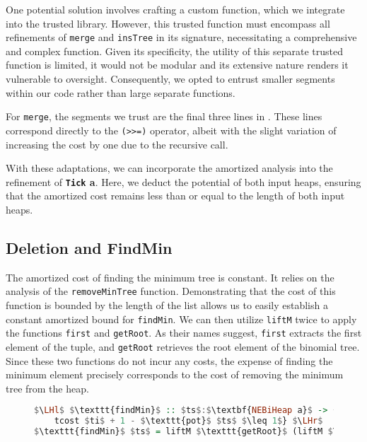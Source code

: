 \documentclass{clmthesis}
\begin{document}
One potential solution involves crafting a custom function, which we integrate into the trusted library. However, this trusted function must encompass all refinements of \texttt{merge} and \texttt{insTree} in its signature, necessitating a comprehensive and complex function. Given its specificity, the utility of this separate trusted function is limited, it would not be modular and its extensive nature renders it vulnerable to oversight. Consequently, we opted to entrust smaller segments within our code rather than large separate functions.

For \texttt{merge}, the segments we trust are the final three lines in . These lines correspond directly to the \texttt{(>>=)} operator, albeit with the slight variation of increasing the cost by one due to the recursive call.

With these adaptations, we can incorporate the amortized analysis into the refinement of \textbf{\lstinline{Tick} a}. Here, we deduct the potential of both input heaps, ensuring that the amortized cost remains less than or equal to the length of both input heaps.


\subsection{Deletion and FindMin}
The amortized cost of finding the minimum tree is constant. It relies on the analysis of the \texttt{removeMinTree} function. Demonstrating that the cost of this function is bounded by the length of the list allows us to easily establish a constant amortized bound for \texttt{findMin}. We can then utilize \texttt{liftM} twice to apply the functions \texttt{first} and \texttt{getRoot}. As their names suggest, \texttt{first} extracts the first element of the tuple, and \texttt{getRoot} retrieves the root element of the binomial tree. Since these two functions do not incur any costs, the expense of finding the minimum element precisely corresponds to the cost of removing the minimum tree from the heap.

\begin{figure}[h]
\begin{lstlisting}[mathescape=true, language=haskell, caption={Amortized cost analysis of \texttt{findMin}.},captionpos=b, label=fig:findMinPot]
$\LHl$ $\texttt{findMin}$ :: $ts$:$\textbf{NEBiHeap a}$ -> {$ti$:$\textbf{Tick a}$ | 
	tcost $ti$ + 1 - $\texttt{pot}$ $ts$ $\leq 1$} $\LHr$
$\texttt{findMin}$ $ts$ = liftM $\texttt{getRoot}$ (liftM $\texttt{first}$ ($\texttt{removeMinTree}$ $ts$))
\end{lstlisting}
\end{figure}
\end{document}
